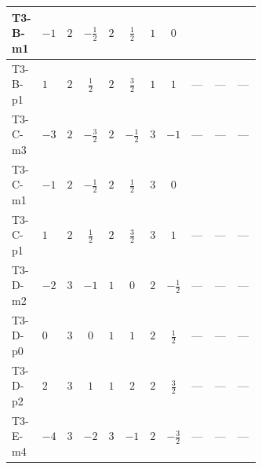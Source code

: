 \documentclass[8pt]{article}
\begin{document}
\begin{landscape}
\begin{longtable}{@{}llcccccc >{\raggedright\arraybackslash}p{0.21\linewidth} >{\raggedright\arraybackslash}p{0.21\linewidth} >{\raggedright\arraybackslash}p{0.21\linewidth}@{}}
\midrule
T3-B-m1 & $-1$ & $2$ & $-\frac{1}{2}$ & $2$ & $\frac{1}{2}$ & $1$ & $0$ & \scriptsize\adjustbox{max width=\linewidth}{$\begin{gathered} +6 {\lambda_{9}} \left({\lambda_{H H^\dagger S_1^\dagger S_2^\dagger}^{\rm Cross}}\right)^{*}\end{gathered}$} & \scriptsize\adjustbox{max width=\linewidth}{$\begin{gathered} -6 \left({\lambda_{8}}\right)^{*} \left({\lambda_5}\right)^{*}\end{gathered}$} & \scriptsize\adjustbox{max width=\linewidth}{$\begin{gathered} -9 {g_2}^2 {\lambda_{H H^\dagger S_1^\dagger S_2^\dagger}^{\rm Cross}}\end{gathered}$} \\
\midrule
T3-B-p1 & $1$ & $2$ & $\frac{1}{2}$ & $2$ & $\frac{3}{2}$ & $1$ & $1$ & --- & --- & --- \\
\midrule
T3-C-m3 & $-3$ & $2$ & $-\frac{3}{2}$ & $2$ & $-\frac{1}{2}$ & $3$ & $-1$ & --- & --- & --- \\
\midrule
T3-C-m1 & $-1$ & $2$ & $-\frac{1}{2}$ & $2$ & $\frac{1}{2}$ & $3$ & $0$ & \scriptsize\adjustbox{max width=\linewidth}{$\begin{gathered} +6 {\lambda_{9}} \left({\lambda_{H H^\dagger S_1^\dagger S_2^\dagger}^{\rm Cross}}\right)^{*}\end{gathered}$} & \scriptsize\adjustbox{max width=\linewidth}{$\begin{gathered} -6 \left({\lambda_{8}}\right)^{*} \left({\lambda_5}\right)^{*}\end{gathered}$} & \scriptsize\adjustbox{max width=\linewidth}{$\begin{gathered} -9 {g_2}^2 {\lambda_{H H^\dagger S_1^\dagger S_2^\dagger}^{\rm Cross}}\end{gathered}$} \\
\midrule
T3-C-p1 & $1$ & $2$ & $\frac{1}{2}$ & $2$ & $\frac{3}{2}$ & $3$ & $1$ & --- & --- & --- \\
\midrule
T3-D-m2 & $-2$ & $3$ & $-1$ & $1$ & $0$ & $2$ & $-\frac{1}{2}$ & --- & --- & --- \\
\midrule
T3-D-p0 & $0$ & $3$ & $0$ & $1$ & $1$ & $2$ & $\frac{1}{2}$ & --- & --- & --- \\
\midrule
T3-D-p2 & $2$ & $3$ & $1$ & $1$ & $2$ & $2$ & $\frac{3}{2}$ & --- & --- & --- \\
\midrule
T3-E-m4 & $-4$ & $3$ & $-2$ & $3$ & $-1$ & $2$ & $-\frac{3}{2}$ & --- & --- & --- \\

\end{longtable}
\end{landscape}
\end{document}
